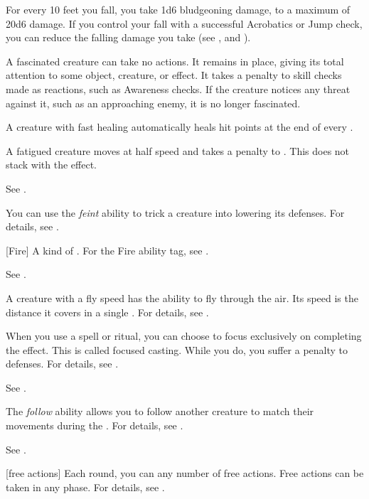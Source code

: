  For every 10 feet you fall, you take 1d6 bludgeoning damage, to a maximum of 20d6 damage.
If you control your fall with a successful Acrobatics or Jump check, you can reduce the falling damage you take (see , and ).

 A fascinated creature can take no actions. It remains in place, giving its total attention to some object, creature, or effect. It takes a  penalty to skill checks made as reactions, such as Awareness checks. If the creature notices any threat against it, such as an approaching enemy, it is no longer fascinated.

 A creature with fast healing automatically heals hit points at the end of every .

 A fatigued creature moves at half speed and takes a  penalty to .
This does not stack with the  effect.

 See .

 You can use the \textit{feint} ability to trick a creature into lowering its defenses.
For details, see .

[Fire] A kind of . For the Fire ability tag, see .

 See .

 A creature with a fly speed has the ability to fly through the air.
Its speed is the distance it covers in a single .
For details, see .

 When you use a spell or ritual, you can choose to focus exclusively on completing the effect.
This is called focused casting.
While you do, you suffer a  penalty to defenses.
For details, see .

 See .

 The \textit{follow} ability allows you to follow another creature to match their movements during the .
For details, see .

 See .

[free actions] Each round, you can any number of free actions.
Free actions can be taken in any phase.
For details, see .


